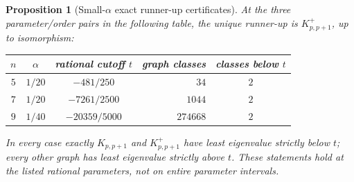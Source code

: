 \documentclass[11pt]{amsart}
\newtheorem{proposition}[theorem]{Proposition}
\theoremstyle{definition}
\begin{document}
\begin{proposition}[Small-$\alpha$ exact runner-up certificates]\label{prop:smallalpha}
At the three parameter/order pairs in the following table, the unique runner-up is $K_{p,p+1}^{+}$, up to isomorphism:
\begin{center}
\begin{tabular}{c|c|c|r|c}
$n$&$\alpha$&rational cutoff $t$&graph classes&classes below $t$\\\hline
$5$&$1/20$&$-481/250$&$34$&$2$\\
$7$&$1/20$&$-7261/2500$&$1044$&$2$\\
$9$&$1/40$&$-20359/5000$&$274668$&$2$
\end{tabular}
\end{center}
In every case exactly $K_{p,p+1}$ and $K_{p,p+1}^{+}$ have least eigenvalue strictly below $t$; every other graph has least eigenvalue strictly above $t$. These statements hold at the \emph{listed rational parameters}, not on entire parameter intervals.
\end{proposition}
\end{document}
